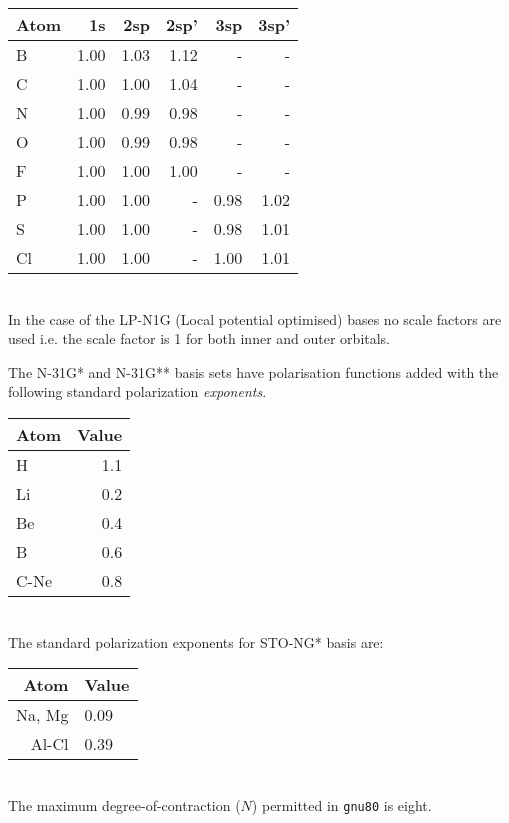 \begin{center}
\begin{tabular}{|l|r|r|r|r|r|}
\hline
Atom & 1s & 2sp & 2sp' & 3sp & 3sp'  \\
\hline
B & 1.00 & 1.03 & 1.12 & - & - \\
C & 1.00 & 1.00 & 1.04 & - & -\\
N & 1.00 & 0.99 & 0.98 & - & -\\
O & 1.00 & 0.99 & 0.98 & - & -\\
F & 1.00 & 1.00 & 1.00 & - & -\\
P & 1.00 & 1.00 & - & 0.98 & 1.02 \\
S & 1.00 & 1.00 & - & 0.98 & 1.01 \\
Cl & 1.00 & 1.00 & - & 1.00 & 1.01 \\
\hline
\end{tabular}
\end{center}
\ \\
In the case of the LP-N1G (Local potential optimised) bases
no scale factors are used i.e. the scale factor is 1 for both
inner and outer orbitals.

The N-31G* and N-31G** basis sets
have polarisation functions added with the following
standard polarization {\em exponents}. \\
\begin{center}
\begin{tabular}{|l|r|}
\hline
Atom &   Value \\
\hline
H    &  1.1  \\
Li   &  0.2 \\
Be   &  0.4 \\
B    &  0.6 \\
C-Ne &  0.8 \\
\hline
\end{tabular}
\end{center} 
\ \\  
The standard polarization exponents for STO-NG* basis are: 
\ \\
\begin{center}
\begin{tabular}{|r|l|}
\hline
Atom  &  Value \\
\hline
Na, Mg &  0.09 \\
Al-Cl &  0.39 \\
\hline
\end{tabular}
\end{center}
\ \\
The maximum degree-of-contraction ($N$) permitted in {\tt gnu80} is eight.

